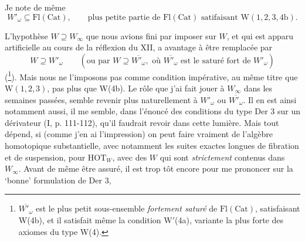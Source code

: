 Je note de même
\[
W'_\omega \subseteq \mathrm{Fl}(\mathrm{Cat}), \qquad \text{plus petite partie de } \mathrm{Fl}(\mathrm{Cat}) \text{ satifaisant } \mathrm{W}(1, 2, 3, 4\mathrm{b}). %
\]


L'hypothèse $W \supseteq W_\infty$ que nous avions fini par imposer sur $W$, et qui est apparu artificielle au cours de la réflexion du XII, a avantage à être remplacée par %
\[
W \supseteq W'_\omega \qquad (\text{ou par } W \supseteq \overline{W'_\omega}, \text{ où } \overline{W'_\omega} \text{ est le saturé fort de } W'_\omega)
\]
(\footnote{$\overline{W'_\omega}$ est le plus petit sous-ensemble \textit{fortement saturé} de $\mathrm{Fl}(\mathrm{Cat})$, satisfaisant W(4b), et il satisfait même la condition W$'$(4a), variante la plus forte des axiomes du type W(4).}). Mais nous ne l'imposons pas comme condition impérative, au même titre que $\mathrm{W}(1,2,3)$, pas plus que W(4b). Le rôle que j'ai fait jouer à $W_\infty$ dans les semaines passées, semble revenir plus naturellement à $W'_\omega$ ou $\overline{W'_\omega}$. Il en est ainsi notamment aussi, il me semble, dans l'énoncé des conditions du type Der 3 sur un dérivateur (I, p. 111-112), qu'il faudrait revoir dans cette lumière. Mais tout dépend, si (comme j'en ai l'impression) on peut faire vraiment de l'algèbre homotopique substantielle, avec notamment les suites exactes longues de fibration et de suspension, pour $\mathrm{HOT}_W$, avec des $W$ qui sont \textit{strictement} contenus dans $W_\infty$. Avant de même être assuré, il est trop tôt encore pour me prononcer sur la `bonne' formulation de Der 3,

